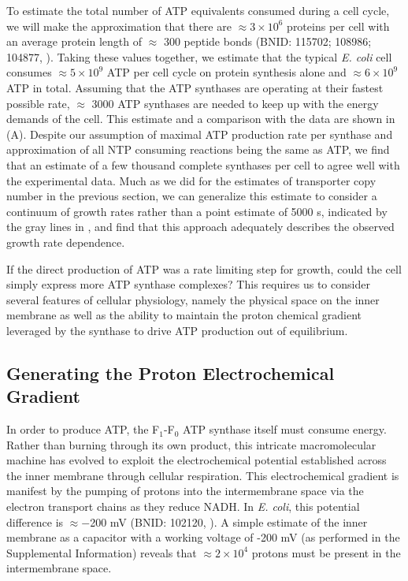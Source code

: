 To estimate the total number of ATP equivalents consumed during a cell cycle,
we will make the approximation that there are $\approx 3\times10^6$ proteins
per cell with an average protein length of $\approx$ 300 peptide bonds (BNID:
115702; 108986; 104877, \cite{milo2010}). Taking these values together, we
estimate that the typical \textit{E. coli} cell consumes $\approx 5 \times
10^9$ ATP per cell cycle on protein synthesis alone and $\approx 6\times
10^9$ ATP in total. Assuming that the ATP synthases are operating at their
fastest possible rate, $\approx$ 3000 ATP synthases are needed to keep up
with the energy demands of the cell. This estimate and a comparison with the
data are shown in  (A). Despite our assumption of
maximal ATP production rate per synthase and approximation of all NTP
consuming reactions being the same as ATP, we find that an estimate of a few
thousand complete synthases per cell to agree well with the experimental
data. Much as we did for the estimates of transporter copy number in the
previous section, we can
generalize this estimate to consider a continuum of growth rates rather than a
point estimate of 5000 s, indicated by the gray lines in
, and find that this approach adequately describes the
observed growth rate dependence.

If the direct production of ATP was a rate limiting step for
growth, could the cell simply express more ATP synthase complexes? This
requires us to consider several features of cellular physiology, namely the
physical space on the inner membrane as well as the ability to maintain the
proton chemical gradient leveraged by the synthase to drive ATP production
out of equilibrium.

\subsection{Generating the Proton Electrochemical Gradient}
In order to produce ATP, the F$_1$-F$_0$ ATP synthase itself must consume
energy. Rather than burning through its own product, this intricate
macromolecular machine has evolved to exploit the electrochemical potential
established across the inner membrane through cellular respiration. This
electrochemical gradient is manifest  by the pumping of protons into the
intermembrane space via the electron transport chains as they reduce NADH. In
\textit{E. coli}, this potential difference is $\approx -$200 mV (BNID: 102120,
\cite{milo2010}). A simple estimate of the inner membrane as a capacitor with a
working voltage of -200 mV (as performed in the Supplemental Information)
reveals that $\approx 2\times 10^4$ protons must be present in the intermembrane space.

